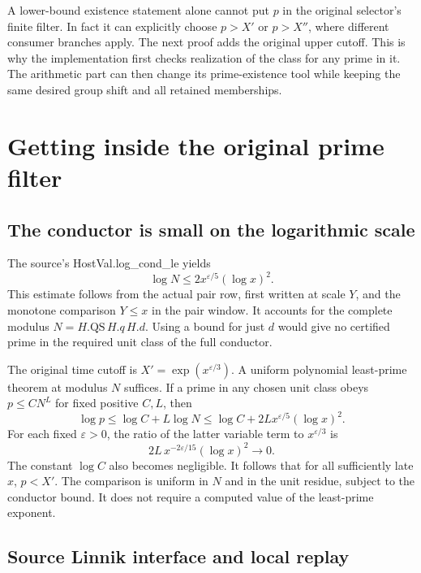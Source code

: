 \documentclass[12pt,letterpaper]{article}
\DeclareRobustCommand{\id}[1]{\mbox{\small\ttfamily #1}}
\begin{document}
A lower-bound existence statement alone cannot put \(p\) in the original selector's finite filter. In fact it can explicitly choose \(p>X'\) or \(p>X''\), where different consumer branches apply. The next proof adds the original upper cutoff. This is why the implementation first checks realization of the class for any prime in it. The arithmetic part can then change its prime-existence tool while keeping the same desired group shift and all retained memberships.

\section{Getting inside the original prime filter}
\label{sec:cutoff}

\subsection{The conductor is small on the logarithmic scale}

The source's \id{HostVal.log\_cond\_le} yields
\begin{equation}
             \log N\le2 x^{\varepsilon/5}(\log x)^2 .
 \label{eq:conductor}
\end{equation}
This estimate follows from the actual pair row, first written at scale \(Y\), and the monotone comparison \(Y\le x\) in the pair window. It accounts for the complete modulus \(N=H.\mathrm{QS}\,H.q\,H.d\). Using a bound for just \(d\) would give no certified prime in the required unit class of the full conductor.

The original time cutoff is \(X'=\exp(x^{\varepsilon/3})\). A uniform polynomial least-prime theorem at modulus \(N\) suffices. If a prime in any chosen unit class obeys \(p\le C N^L\) for fixed positive \(C,L\), then
\[
      \log p\le\log C+L\log N
             \le \log C+2L x^{\varepsilon/5}(\log x)^2.
\]
For each fixed \(\varepsilon>0\), the ratio of the latter variable term to \(x^{\varepsilon/3}\) is
\[
            2L\,x^{-2\varepsilon/15}(\log x)^2 \longrightarrow0.
\]
The constant \(\log C\) also becomes negligible. It follows that for all sufficiently late \(x\), \(p<X'\). The comparison is uniform in \(N\) and in the unit residue, subject to the conductor bound. It does not require a computed value of the least-prime exponent.

\subsection{Source Linnik interface and local replay}
\end{document}
